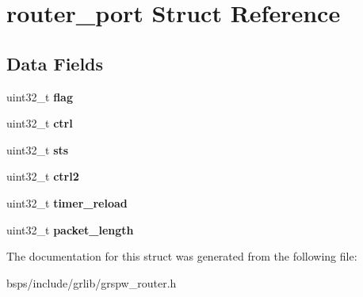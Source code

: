 \hypertarget{structrouter__port}{}\section{router\+\_\+port Struct Reference}
\label{structrouter__port}
\subsection*{Data Fields}
\begin{DoxyCompactItemize}
\item 
\mbox{\label{structrouter__port_a5496372553ff1736a04fe48f65ee7144}} 
uint32\+\_\+t {\bfseries flag}
\item 
\mbox{\label{structrouter__port_a5b56ce566f9ffc3732359d37e7885456}} 
uint32\+\_\+t {\bfseries ctrl}
\item 
\mbox{\label{structrouter__port_ad3edcddd35260d1d98e0a8d314b09d0d}} 
uint32\+\_\+t {\bfseries sts}
\item 
\mbox{\label{structrouter__port_a4b81f483cc58d8483c5653adabb2b7ce}} 
uint32\+\_\+t {\bfseries ctrl2}
\item 
\mbox{\label{structrouter__port_af526f6db0502999aa6a94d9a4e6222ec}} 
uint32\+\_\+t {\bfseries timer\+\_\+reload}
\item 
\mbox{\label{structrouter__port_ad8d1f1b0aba53be0f334241e004c66b8}} 
uint32\+\_\+t {\bfseries packet\+\_\+length}
\end{DoxyCompactItemize}


The documentation for this struct was generated from the following file\+:\begin{DoxyCompactItemize}
\item 
bsps/include/grlib/grspw\+\_\+router.\+h\end{DoxyCompactItemize}
